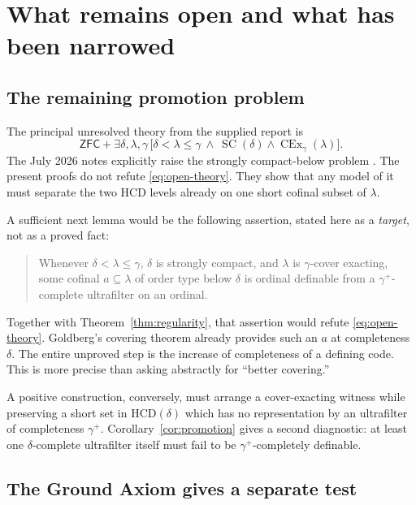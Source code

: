 \documentclass[11pt,letterpaper]{article}
\theoremstyle{definition}
\newcommand{\ZFC}{\mathsf{ZFC}}
\newcommand{\SC}{\operatorname{SC}}
\newcommand{\CEx}{\operatorname{CEx}}
\newcommand{\HCD}{\mathrm{HCD}}
\begin{document}
\section{What remains open and what has been narrowed}\label{sec:limits}

\subsection{The remaining promotion problem}

The principal unresolved theory from the supplied report is
\begin{equation}\label{eq:open-theory}
\ZFC+\exists\delta,\lambda,\gamma\,
\bigl[\delta<\lambda\le\gamma\ \wedge\ \SC(\delta)\wedge\CEx_\gamma(\lambda)\bigr].
\end{equation}
The July 2026 notes explicitly raise the strongly compact-below problem \cite[Problem 5.2]{cover}. The present proofs do not refute \eqref{eq:open-theory}. They show that any model of it must separate the two HCD levels already on one short cofinal subset of $\lambda$.

A sufficient next lemma would be the following assertion, stated here as a \emph{target}, not as a proved fact:
\begin{quote}
Whenever $\delta<\lambda\le\gamma$, $\delta$ is strongly compact, and $\lambda$ is $\gamma$-cover exacting, some cofinal $a\subseteq\lambda$ of order type below $\delta$ is ordinal definable from a $\gamma^+$-complete ultrafilter on an ordinal.
\end{quote}
Together with Theorem~\ref{thm:regularity}, that assertion would refute \eqref{eq:open-theory}. Goldberg's covering theorem already provides such an $a$ at completeness $\delta$. The entire unproved step is the increase of completeness of a defining code. This is more precise than asking abstractly for ``better covering.''

A positive construction, conversely, must arrange a cover-exacting witness while preserving a short set in $\HCD(\delta)$ which has no representation by an ultrafilter of completeness $\gamma^+$. Corollary~\ref{cor:promotion} gives a second diagnostic: at least one $\delta$-complete ultrafilter itself must fail to be $\gamma^+$-completely definable.

\subsection{The Ground Axiom gives a separate test}
\end{document}
